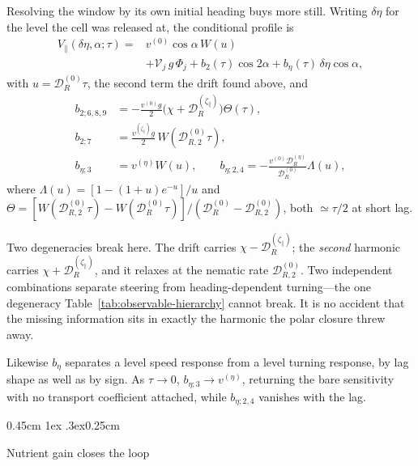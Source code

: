\documentclass[
  reprint,
  superscriptaddress,
  amsmath,
  amssymb,
  aps,
  pre,
  nofootinbib,
  floatfix
]{revtex4-2}
\makeatletter
\newcommand{\DR}{\mathcal D_R^{(0)}}
\newcommand{\DRtwo}{\mathcal D_{R,2}^{(0)}}
\newcommand{\zp}{\zeta_\parallel}
\def\subsection{\@startsection{subsection}{2}{\z@}%
  {0.45cm \@plus1ex \@minus.3ex}{0.25cm}%
  {\normalfont\small\bfseries\raggedright}}%
\makeatother
\begin{document}
Resolving the window by its own initial heading buys more still.  Writing
$\delta\eta$ for the level the cell was released at, the conditional profile
is
\begin{equation}
\begin{split}
 V_\parallel(\delta\eta,\alpha;\tau)={}&v^{(0)}\cos\alpha\,W(u)\\
 &+\mathcal V_j\,g\,\Phi_j
 +b_2(\tau)\cos2\alpha
 +b_\eta(\tau)\,\delta\eta\cos\alpha,
\end{split}
 \label{eq:navigation-harmonics}
\end{equation}
with $u=\DR\tau$, the second term the drift found above, and
\begin{equation}
\begin{aligned}
 b_{2;6,8,9}&=-\frac{v^{(0)}g}{2}
 \bigl(\chi+\mathcal D_R^{(\zp)}\bigr)\Theta(\tau),\\
 b_{2;7}&=\frac{v^{(\zp)}g}{2}\,W\!\left(\DRtwo\tau\right),\\
 b_{\eta;3}&=v^{(\eta)}W(u),
 \qquad
 b_{\eta;2,4}=-\frac{v^{(0)}\mathcal D_R^{(\eta)}}{\DR}\Lambda(u),
\end{aligned}
 \label{eq:navigation-coefficients}
\end{equation}
where $\Lambda(u)=[1-(1+u)e^{-u}]/u$ and
$\Theta=[W(\DRtwo\tau)-W(\DR\tau)]/(\DR-\DRtwo)$, both $\simeq\tau/2$ at short
lag.

Two degeneracies break here.  The drift carries $\chi-\mathcal D_R^{(\zp)}$;
the \emph{second} harmonic carries $\chi+\mathcal D_R^{(\zp)}$, and it relaxes
at the nematic rate $\DRtwo$.  Two independent combinations separate steering
from heading-dependent turning---the one degeneracy
Table~\ref{tab:observable-hierarchy} cannot break.  It is no accident that the
missing information sits in exactly the harmonic the polar closure threw away.

Likewise $b_\eta$ separates a level speed response from a level turning
response, by lag shape as well as by sign.  As $\tau\to0$,
$b_{\eta;3}\to v^{(\eta)}$, returning the bare sensitivity with no transport
coefficient attached, while $b_{\eta;2,4}$ vanishes with the lag.

\subsection{Nutrient gain closes the loop}
\end{document}

